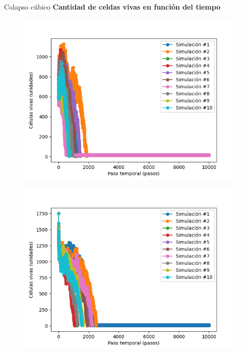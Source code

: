 \begin{frame}{Colapso cúbico}
    \textbf{Cantidad de celdas vivas en función del tiempo}
    {\footnotesize
    \begin{multicols}{3}
        {
            \begin{figure}[H]
                \centering
                \includegraphics[width=0.8\linewidth]{pic/collapse3d/size_i10}
                \label{fig:colapso:size:i10}
            \end{figure}
        }

        {
            \begin{figure}[H]
                \centering
                \includegraphics[width=0.8\linewidth]{pic/collapse3d/size_i30}
                \label{fig:colapso:size:i30}
            \end{figure}
        }


\end{multicols}}
\end{frame}
